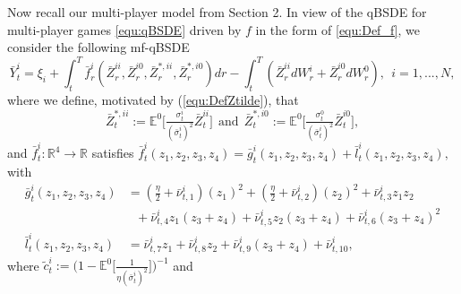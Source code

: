 \documentclass[10pt,a4paper]{article}
\theoremstyle{plain}
\theoremstyle{definition}
\numberwithin{equation}{section}
\begin{document}
Now recall our multi-player model from Section 2. In view of the qBSDE for multi-player games \eqref{equ:qBSDE} driven by $f$ in the form of \eqref{equ:Def_f}, we consider the following mf-qBSDE
\begin{equation}
\label{equ:4.1}
\bar{Y}_{t}^{i} = \xi_{i} + \int_{t}^{T}\bar{f}_{r}^{i}(\bar{Z}_{r}^{ii},\bar{Z}_{r}^{i0},\bar{Z}_{r}^{*,ii},\bar{Z}_{r}^{*,i0})dr - \int_{t}^{T}(\bar{Z}_{r}^{ii}dW_{r}^{i}+\bar{Z}_{r}^{i0}dW_{r}^{0}), \ \ i=1,...,N,
\end{equation}
where we define, motivated by (\ref{equ:DefZtilde}), that
\begin{equation}
\label{equ:DefZ*}
\bar{Z}_{t}^{*,ii} := \mathds{E}^{0}\bigl[\tfrac{\sigma_{t}^{i}}{(\bar{\sigma}_{t}^{i})^{2}}\bar{Z}_{t}^{ii}\bigr] \ \ \text{and} \ \ \bar{Z}_{t}^{*,i0} := \mathds{E}^{0}\bigl[\tfrac{\sigma_{t}^{0}}{(\bar{\sigma}_{t}^{i})^{2}}\bar{Z}_{t}^{i0}\bigr],
\end{equation}
and $\bar{f}_{t}^{i}:\mathds{R}^{4} \rightarrow \mathds{R}$ satisfies
$
\bar{f}_{t}^{i}(z_{1},z_{2},z_{3},z_{4}) = \bar{g}_{t}^{i}(z_{1},z_{2},z_{3},z_{4}) + \bar{l}_{t}^{i}(z_{1},z_{2},z_{3},z_{4}) ,
$
with
\begin{align}\nonumber
\bar{g}_{t}^{i}(z_{1},z_{2},z_{3},z_{4}) &= (\tfrac{\eta}{2}+\bar{\nu}_{t,1}^{i})(z_{1})^{2} + (\tfrac{\eta}{2}+\bar{\nu}_{t,2}^{i})(z_{2})^{2} + \bar{\nu}_{t,3}^{i}z_{1}z_{2}\\
&\ \ \ + \bar{\nu}_{t,4}^{i}z_{1}(z_{3}+z_{4}) + \bar{\nu}_{t,5}^{i}z_{2}(z_{3}+z_{4}) + \bar{\nu}_{t,6}^{i}(z_{3}+z_{4})^{2} \label{equ:Def_gbar}\\
\bar{l}_{t}^{i}(z_{1},z_{2},z_{3},z_{4}) &= \bar{\nu}_{t,7}^{i}z_{1} + \bar{\nu}_{t,8}^{i}z_{2} + \bar{\nu}_{t,9}^{i}(z_{3}+z_{4}) + \bar{\nu}_{t,10}^{i}, \label{equ:Def_lbar}
\end{align}
where $\tilde{c}_{t}^i := \bigl(1-\mathds{E}^{0}\bigl[\tfrac{1}{\eta(\bar{\sigma}_{t}^{i})^{2}}\bigr]\bigr)^{-1}$ and
\end{document}
